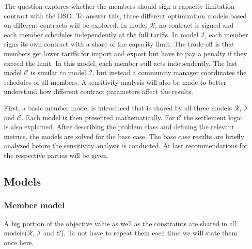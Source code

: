 The question explores whether the members should sign a capacity limitation contract with the DSO. To answer this, three different optimization models based on different contracts will be explored. In model $\mathcal{R}$, no contract is signed and each member schedules independently at the full tariffs. In model $\mathcal{I}$, each member signs its own contract with a share of the capacity limit. The trade-off is that members get lower tariffs for import and export but have to pay a penalty if they exceed the limit. In this model, each member still acts independently. The last model $\mathcal{C}$ is similar to model $\mathcal{I}$, but instead a community manager coordinates the schedules of all members. A sensitivity analysis will also be made to better understand how different contract parameters affect the results.

First, a basic member model is introduced that is shared by all three models $\mathcal{R}$, $\mathcal{I}$ and $\mathcal{C}$. Each model is then presented mathematically. For $\mathcal{C}$ the settlement logic is also explained. After describing the problem class and defining the relevant metrics, the models are solved for the base case. The base case results are briefly analyzed before the sensitivity analysis is conducted. At last recommendations for the respective parties will be given.


\subsection{Models}
\subsubsection{Member model}
A big portion of the objective value as well as the constraints are shared in all models($\mathcal{R}$, $\mathcal{I}$ and $\mathcal{C}$). To not have to repeat them each time we will state them once here. 

